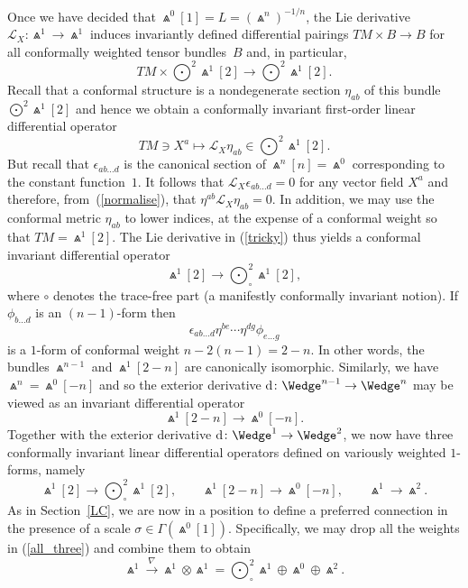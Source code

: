 \documentclass[10pt,a4paper]{amsart}
\numberwithin{equation}{section}
\begin{document}
Once we have decided that $\Wedge^0[1]=L=(\Wedge^n)^{-1/n}$, the Lie
derivative ${\mathcal{L}}_X\colon \Wedge^1\to\Wedge^1$ induces invariantly
defined differential pairings $TM\times B\to B$ for all conformally weighted
tensor bundles~$B$ and, in particular,
\[\textstyle TM\times\bigodot^2\!\Wedge^1[2]\to\bigodot^2\!\Wedge^1[2].\]
Recall that a conformal structure is a nondegenerate section $\eta_{ab}$
of this bundle $\bigodot^2\!\Wedge^1[2]$
and hence we obtain a conformally invariant first-order linear differential
operator
\begin{equation}\label{tricky}\textstyle
TM\ni X^a\longmapsto{\mathcal{L}}_X\eta_{ab}\in\bigodot^2\!\Wedge^1[2].
\end{equation}
But recall that $\epsilon_{ab\dots d}$ is the canonical section of
$\Wedge^n[n]=\Wedge^0$ corresponding to the constant function~$1$. It follows
that ${\mathcal{L}}_X\epsilon_{ab\dots d}=0$ for any vector field $X^a$ and
therefore, from~(\ref{normalise}), that $\eta^{ab}{\mathcal{L}}_X\eta_{ab}=0$.
In addition, we may use the conformal metric $\eta_{ab}$ to lower indices, at
the expense of a conformal weight so that $TM=\Wedge^1[2]$. The Lie derivative
in (\ref{tricky}) thus yields a conformal invariant differential operator
\[\textstyle\Wedge^1[2]\longrightarrow\bigodot_\circ^2\!\Wedge^1[2],\]
where $\circ$ denotes the trace-free part (a manifestly conformally invariant
notion). If $\phi_{b\dots d}$ is an $(n-1)$-form then
\[\epsilon_{ab\dots d}\eta^{be}\cdots\eta^{dg}\phi_{e\dots g}\]
is a $1$-form of conformal weight $n-2(n-1)=2-n$. In other words, the bundles
$\Wedge^{n-1}$ and $\Wedge^1[2-n]$ are canonically isomorphic. Similarly, we
have $\Wedge^n=\Wedge^0[-n]$ and so the exterior derivative
${\rm d}\colon \Wedge^{n-1}\to\Wedge^n$ may be viewed as an invariant differential operator
\[\Wedge^1[2-n]\to\Wedge^0[-n].\]
Together with the exterior derivative ${\rm d}\colon \Wedge^1\to\Wedge^2$, we now have
three conformally invariant linear differential operators defined on variously
weighted $1$-forms, namely
\begin{equation}\label{all_three}\textstyle
\Wedge^1[2]\to\bigodot_\circ^2\!\Wedge^1[2],
\qquad\Wedge^1[2-n]\to\Wedge^0[-n],\qquad\Wedge^1\to\Wedge^2.\end{equation}
As in Section~\ref{LC}, we are now in a position to define a preferred
connection in the presence of a scale $\sigma\in\Gamma(\Wedge^0[1])$.
Specifically, we may drop all the weights in (\ref{all_three}) and combine
them to obtain
\[\textstyle\Wedge^1\xrightarrow{\,\nabla\,}\Wedge^1\otimes\Wedge^1
=\bigodot_\circ^2\!\Wedge^1\oplus\Wedge^0\oplus\Wedge^2.\]
\end{document}
